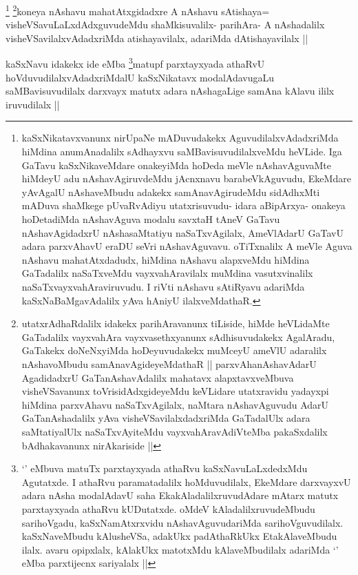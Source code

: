 \begin{artha}
\footnote{kaSxNikatavxvanunx nirUpaNe mADuvudakekx AguvudilalxvAdadxriMda hiMdina anumAnadalilx sAdhayxvu saMBavisuvudilalxveMdu heVLide. Iga GaTavu kaSxNikaveMdare onakeyiMda hoDeda meVle nAshavAguvaMte hiMdeyU adu nAshavAgiruvdeMdu jAcnxnavu barabeVkAguvudu, EkeMdare yAvAgalU nAshaveMbudu adakekx samAnavAgirudeMdu sidAdhxMti mADuva shaMkege pUvaRvAdiyu utatxrisuvudu- idara aBipArxya- onakeya hoDetadiMda nAshavAguva modalu savxtaH tAneV GaTavu nAshavAgidadxrU nAshasaMtatiyu naSaTxvAgilalx, AmeVlAdarU GaTavU adara parxvAhavU eraDU seVri nAshavAguvavu. oTiTxnalilx A meVle Aguva nAshavu mahatAtxdadudx, hiMdina nAshavu alapxveMdu hiMdina GaTadalilx naSaTxveMdu vayxvahAravilalx muMdina vasutxvinalilx naSaTxvayxvahAraviruvudu. I riVti nAshavu sAtiRyavu adariMda kaSxNaBaMgavAdalilx yAva hAniyU ilalxveMdathaR.}
\footnote{utatxrAdhaRdalilx idakekx parihAravanunx tiLiside, hiMde heVLidaMte GaTadalilx vayxvahAra vayxvasethxyanunx sAdhisuvudakekx AgalAradu, GaTakekx doNeNxyiMda hoDeyuvudakekx muMceyU ameVlU adaralilx nAshavoMbudu samAnavAgideyeMdathaR || parxvAhanAshavAdarU AgadidadxrU GaTanAshavAdalilx mahatavx alapxtavxveMbuva visheVSavanunx toVrisidAdxgideyeMdu keVLidare utatxravidu yadayxpi hiMdina parxvAhavu naSaTxvAgilalx, naMtara nAshavAguvudu AdarU GaTanAshadalilx yAva visheVSavilalxdadxriMda GaTadalUlx adara saMtatiyalUlx naSaTxvAyiteMdu vayxvahAravAdiVteMba pakaSxdalilx bAdhakavanunx nirAkariside ||}koneya nAshavu mahatAtxgidadxre A nAshavu sAtishaya= visheVSavuLaLxdAdxguvudeMdu shaMkisuvalilx- parihAra- A nAshadalilx visheVSavilalxvAdadxriMda atishayavilalx, adariMda dAtishayavilalx ||
\end{artha}

\begin{artha}
kaSxNavu idakekx ide eMba \footnote{`\stext' eMbuva matuTx parxtayxyada athaRvu kaSxNavuLaLxdedxMdu Agutatxde. I athaRvu paramatadalilx hoMduvudilalx, EkeMdare darxvayxvU adara nAsha modalAdavU saha EkakAladalilxruvudAdare mAtarx matutx parxtayxyada athaRvu kUDutatxde. oMdeV kAladalilxruvudeMbudu sarihoVgadu, kaSxNamAtxrxvidu nAshavAguvudariMda sarihoVguvudilalx. kaSxNaveMbudu kAlusheVSa, adakUkx padAthaRkUkx EtakAlaveMbudu ilalx. avaru opipxlalx, kAlakUkx matotxMdu kAlaveMbudilalx adariMda `\stext' eMba parxtijecnx sariyalalx ||}matupf parxtayxyada athaRvU hoVduvudilalxvAdadxriMdalU kaSxNikatavx modalAdavugaLu saMBavisuvudilalx darxvayx matutx adara nAshagaLige samAna kAlavu ililx iruvudilalx ||
\end{artha}

